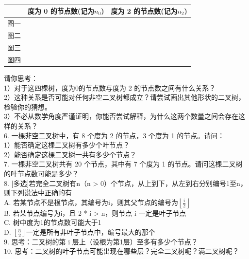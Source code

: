 \begin{center}
    \begin{tabular}{|c|c|c|}
        \hline
         & 度为 0 的节点数(记为\(n_0\)) & 度为 2 的节点数(记为\(n_2\)) \\
        \hline
        图一 &  &  \\
        \hline
        图二 &  &  \\
        \hline
        图三 &  &  \\
        \hline
        图四 & & \\
        \hline
    \end{tabular}
\end{center}

请你思考：\\[0.8em]
1）对于这四棵树，度为0的节点数与度为 2 的节点数之间有什么关系？\\[0.5em]
2）这种关系是否可能对任何非空二叉树都成立？请尝试画出其他形状的二叉树，检验你的猜想。\\[0.5em]
3）不必从数学角度严谨证明，你能否尝试解释，为什么这两个数量之间会存在这样的关系？\\[0.5em]


6. 一棵非空二叉树中，有 8 个度为 2 的节点，3 个度为 1 的节点。请问：\\
1）能否确定这棵二叉树有多少个叶节点？\\[0.5em]
2）能否确定这棵二叉树一共有多少个节点？\\[0.5em]

7. 一棵非空二叉树共有 20 个节点，其中有 7 个度为 1 的节点。请问这棵二叉树的叶节点数可能是多少？\\


8. [多选]若完全二叉树有n（n > 0）个节点，从上到下，从左到右分别编号1至n，则下列说法中正确的有\underline{\hspace{1cm}}\\[0.5em]
A. 若某节点不是根节点，其编号为i，则其父节点的编号为$ \left\lfloor \frac{i}{2} \right\rfloor $ \\
B. 若某节点编号为i，且 2 * i > n，则节点 i 一定是叶子节点\\
C. 树中度为1的节点数可能大于1\\
D. $\left\lfloor \frac{n}{2} \right\rfloor $一定是所有非叶子节点中，编号最大的那个\\

9. 思考：二叉树的第 i 层上（设根为第1层）至多有多少个节点？\\

10. 思考：二叉树的叶子节点可能出现在哪些层？完全二叉树呢？满二叉树呢？\\

